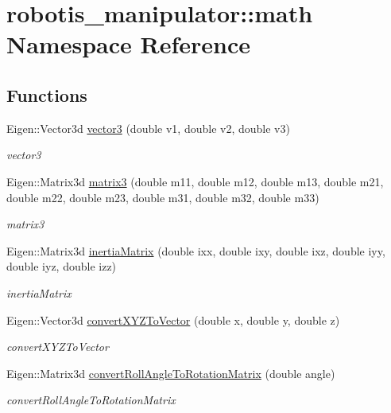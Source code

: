 \hypertarget{namespacerobotis__manipulator_1_1math}{}\section{robotis\+\_\+manipulator\+:\+:math Namespace Reference}
\label{namespacerobotis__manipulator_1_1math}
\subsection*{Functions}
\begin{DoxyCompactItemize}
\item 
Eigen\+::\+Vector3d \hyperlink{namespacerobotis__manipulator_1_1math_a057ca65131575b85aec169f3a50ed796}{vector3} (double v1, double v2, double v3)
\begin{DoxyCompactList}\small\item\em vector3 \end{DoxyCompactList}\item 
Eigen\+::\+Matrix3d \hyperlink{namespacerobotis__manipulator_1_1math_a22fb2daaef2f7943fa0dbd7a24e0fd4d}{matrix3} (double m11, double m12, double m13, double m21, double m22, double m23, double m31, double m32, double m33)
\begin{DoxyCompactList}\small\item\em matrix3 \end{DoxyCompactList}\item 
Eigen\+::\+Matrix3d \hyperlink{namespacerobotis__manipulator_1_1math_a34ebf1c9f0f64e52807fd9798a7d87c8}{inertia\+Matrix} (double ixx, double ixy, double ixz, double iyy, double iyz, double izz)
\begin{DoxyCompactList}\small\item\em inertia\+Matrix \end{DoxyCompactList}\item 
Eigen\+::\+Vector3d \hyperlink{namespacerobotis__manipulator_1_1math_acb3c85751c21502d8d23a13cc08b3cf5}{convert\+X\+Y\+Z\+To\+Vector} (double x, double y, double z)
\begin{DoxyCompactList}\small\item\em convert\+X\+Y\+Z\+To\+Vector \end{DoxyCompactList}\item 
Eigen\+::\+Matrix3d \hyperlink{namespacerobotis__manipulator_1_1math_ab7682932090e254cb077badb80fe8667}{convert\+Roll\+Angle\+To\+Rotation\+Matrix} (double angle)
\begin{DoxyCompactList}\small\item\em convert\+Roll\+Angle\+To\+Rotation\+Matrix \end{DoxyCompactList}\item 

\end{DoxyCompactItemize}
